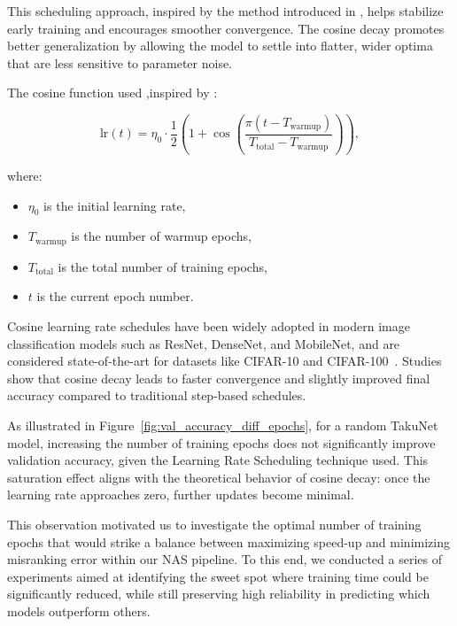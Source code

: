 This scheduling approach, inspired by the method introduced in \cite{loshchilov2016sgdr}, helps stabilize early training and encourages smoother convergence. The cosine decay promotes better generalization by allowing the model to settle into flatter, wider optima that are less sensitive to parameter noise.


The cosine function used ,inspired by \cite{loshchilov2016sgdr} : 

\begin{equation}
\text{lr}(t) = \eta_0 \cdot \frac{1}{2} \left( 1 + \cos\left( \frac{\pi (t - T_\text{warmup})}{T_\text{total} - T_\text{warmup}} \right) \right),
\end{equation}

where:
\begin{itemize}
  \item \( \eta_0 \) is the initial learning rate,
  \item \( T_\text{warmup} \) is the number of warmup epochs,
  \item \( T_\text{total} \) is the total number of training epochs,
  \item \( t \) is the current epoch number.
\end{itemize}


Cosine learning rate schedules have been widely adopted in modern image classification models such as ResNet, DenseNet, and MobileNet, and are considered state-of-the-art for datasets like CIFAR-10 and CIFAR-100~\cite{lewkowycz2021decay}. Studies show that cosine decay leads to faster convergence and slightly improved final accuracy compared to traditional step-based schedules.

As illustrated in Figure~\ref{fig:val_accuracy_diff_epochs}, for a  random TakuNet model, increasing the number of training epochs does not significantly improve validation accuracy, given the Learning Rate Scheduling technique used. This saturation effect aligns with the theoretical behavior of cosine decay: once the learning rate approaches zero, further updates become minimal.

This observation motivated us to investigate the optimal number of training epochs that would strike a balance between maximizing speed-up and minimizing misranking error within our NAS pipeline.
To this end, we conducted a series of experiments aimed at identifying the sweet spot where training time could be significantly reduced, while still preserving high reliability in predicting which models outperform others.

